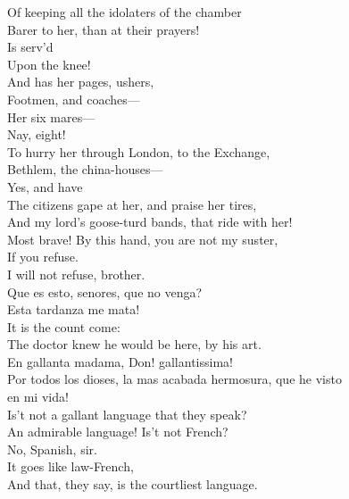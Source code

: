\documentclass[a4paper,oneside]{memoir}
\begin{document}
\begin{drama*}
\facespeaks Of keeping all the idolaters of the chamber\\
Barer to her, than at their prayers!\\
\subtlespeaks {} Is serv'd\\
Upon the knee!\\
\facespeaks {} And has her pages, ushers,\\
Footmen, and coaches---\\
\subtlespeaks {} Her six mares---\\
\facespeaks {} Nay, eight!\\
\subtlespeaks To hurry her through London, to the Exchange,\\
Bethlem, the china-houses---\\
\facespeaks {} Yes, and have\\
The citizens gape at her, and praise her tires,\\
And my lord's goose-turd bands, that ride with her!\\
\kastrilspeaks Most brave! By this hand, you are not my suster,\\
If you refuse.\\
\pliantspeaks {} I will not refuse, brother.\\
\surlyspeaks Que es esto, senores, que no venga?\\
Esta tardanza me mata!\\
\facespeaks {} It is the count come:\\
The doctor knew he would be here, by his art.\\
\subtlespeaks En gallanta madama, Don! gallantissima!\\
\surlyspeaks Por todos los dioses, la mas acabada hermosura, que he visto\\
en mi vida!\\
\facespeaks {} Is't not a gallant language that they speak?\\
\kastrilspeaks An admirable language! Is't not French?\\
\facespeaks No, Spanish, sir.\\
\kastrilspeaks {} It goes like law-French,\\
And that, they say, is the courtliest language.\\

\end{drama*}
\end{document}
